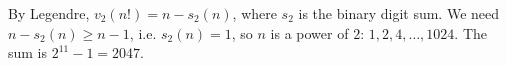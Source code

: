 By Legendre, $v_2(n!)=n-s_2(n)$, where $s_2$ is the binary digit sum. We need $n-s_2(n)\ge n-1$, i.e. $s_2(n)=1$, so $n$ is a power of $2$: $1,2,4,\dots,1024$. The sum is $2^{11}-1=\boxed{2047}$.
